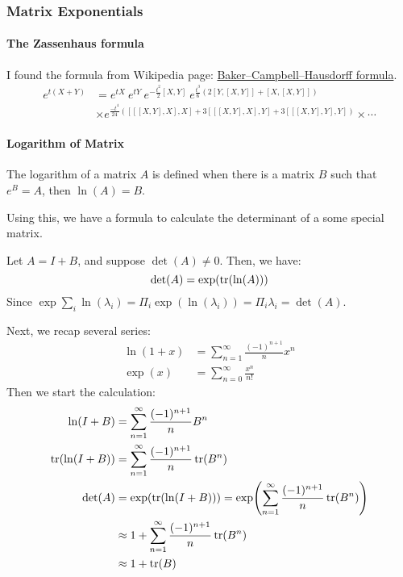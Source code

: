     \subsubsection{Matrix Exponentials}
    \label{sec:Matrix-Exponentials}
    \paragraph{The Zassenhaus formula}
    I found the formula from Wikipedia page:
    \href{https://en.wikipedia.org/wiki/Baker%E2%80%93Campbell%E2%80%93Hausdorff_formula}{Baker–Campbell–Hausdorff formula}.
    \begin{align}
        e^{t(X+Y)} &= e^{tX}~ e^{tY} ~e^{-\frac{t^2}{2} [X,Y]} ~
        e^{\frac{t^3}{6}(2[Y,[X,Y]]+ [X,[X,Y]] )} \nonumber\\
        & \times
          e^{\frac{-t^4}{24}([[[X,Y],X],X] + 3[[[X,Y],X],Y] + 3[[[X,Y],Y],Y]) }
        \times\cdots
    \end{align}

    \paragraph{Logarithm of Matrix}
    The logarithm of  a matrix $A$ is defined when there is a matrix $B$ such that
    $e^B=A$, then $\ln(A)=B$.

    Using this, we have a formula to calculate the determinant of a some special
    matrix.

    Let $A = I + B$, and suppose $\det(A)\neq
    0$. Then, we have:
    \begin{equation}
        \det(A) = \exp(\tr(\ln(A)))
    \end{equation}
    Since $\exp{\sum_i \ln(\lambda_i)} = \Pi_i \exp(\ln(\lambda_i))=\Pi_i
    \lambda_i=\det(A)$.

    Next, we recap several series:
    \begin{align*}
        \ln(1+x) &= \sum_{n=1}^{\infty} \frac{(-1)^{n+1}}{n}x^n \\
        \exp(x) &= \sum_{n=0}^{\infty} \frac{x^n}{n!}
    \end{align*}
    Then we start the calculation:
    \begin{align*}
        \ln(I+B) &= \sum_{n=1}^{\infty} \frac{(-1)^{n+1}}{n}B^n \\
        \tr(\ln(I+B)) &= \sum_{n=1}^{\infty} \frac{(-1)^{n+1}}{n}\tr(B^n) \\
        \det(A) &= \exp(\tr(\ln(I+B))) 
            = \exp(\sum_{n=1}^{\infty} \frac{(-1)^{n+1}}{n}\tr(B^n)) \\
            &\approx 1+ \sum_{n=1}^{\infty} \frac{(-1)^{n+1}}{n}\tr(B^n) \\
            &\approx 1+ \tr(B)
    \end{align*}

